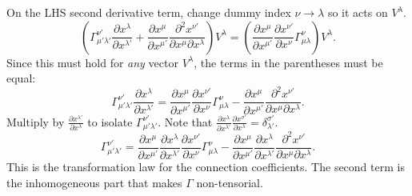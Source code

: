 \documentclass[11pt, a4paper]{report}
\begin{document}
On the LHS second derivative term, change dummy index \(\nu \to \lambda\) so it acts on \(V^\lambda\).
\begin{equation}
\left( \Gamma^{\nu'}_{\mu'\lambda'} \frac{\partial x^\lambda}{\partial x^{\lambda'}} + \frac{\partial x^\mu}{\partial x^{\mu'}} \frac{\partial^2 x^{\nu'}}{\partial x^\mu \partial x^\lambda} \right) V^\lambda = \left( \frac{\partial x^\mu}{\partial x^{\mu'}} \frac{\partial x^{\nu'}}{\partial x^\nu} \Gamma^\nu_{\mu\lambda} \right) V^\lambda.
\end{equation}
Since this must hold for \emph{any} vector \(V^\lambda\), the terms in the parentheses must be equal:
\begin{equation}
\Gamma^{\nu'}_{\mu'\lambda'} \frac{\partial x^\lambda}{\partial x^{\lambda'}} = \frac{\partial x^\mu}{\partial x^{\mu'}} \frac{\partial x^{\nu'}}{\partial x^\nu} \Gamma^\nu_{\mu\lambda} - \frac{\partial x^\mu}{\partial x^{\mu'}} \frac{\partial^2 x^{\nu'}}{\partial x^\mu \partial x^\lambda}.
\end{equation}
Multiply by \(\frac{\partial x^{\lambda'}}{\partial x^\lambda}\) to isolate \(\Gamma^{\nu'}_{\mu'\lambda'}\). Note that \(\frac{\partial x^\lambda}{\partial x^{\lambda'}} \frac{\partial x^{\sigma'}}{\partial x^\lambda} = \delta^{\sigma'}_{\lambda'}\).
\begin{equation}
\label{eq:gamma_transformation}
\Gamma^{\nu'}_{\mu'\lambda'} = \frac{\partial x^\mu}{\partial x^{\mu'}} \frac{\partial x^\lambda}{\partial x^{\lambda'}} \frac{\partial x^{\nu'}}{\partial x^\nu} \Gamma^\nu_{\mu\lambda} - \frac{\partial x^\mu}{\partial x^{\mu'}} \frac{\partial x^{\lambda}}{\partial x^{\lambda'}} \frac{\partial^2 x^{\nu'}}{\partial x^\mu \partial x^\lambda}.
\end{equation}
This is the transformation law for the connection coefficients. The second term is the inhomogeneous part that makes \(\Gamma\) non-tensorial.
\end{document}
